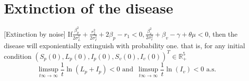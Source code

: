 \section{Extinction of the disease}

\begin{theorem}\label{theorem_noise}[Extinction by noise]
	If$\frac{\beta_p^2}{2\sigma_L^2}+\frac{r_2^2}{2\sigma_I^2}+2\beta_p-r_1<0,\frac{\beta_v^2}{2\sigma_v^2}+\beta_v-\gamma+\theta\mu<0$, then the disease will exponientially extinguish with probability one. that is, for any initial condition $(S_p(0),L_p(0),I_p(0),S_v(0),I_v(0))^T\in \mathbb{R}_+^5$
	\begin{equation*}
		\limsup_{t\infty \rightarrow \infty}\frac{1}{t}\ln(L_p+I_p)< 0\,\, \mbox{and}\,\,\, \limsup_{t\infty \rightarrow \infty}\frac{1}{t}\ln(I_v)< 0\,\,\mbox{a.s.}
	\end{equation*}
\end{theorem}

